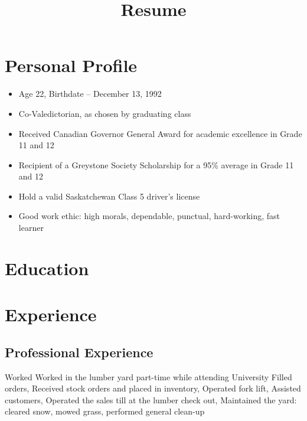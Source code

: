 \documentclass[11pt,letterpaper,sans]{moderncv}        %
\title{Resume}                               %
\begin{document}
\makecvtitle
\vspace*{-1cm} %

\section{Personal Profile}
\cvitem{}
{
  \begin{itemize}
    \item Age 22, Birthdate -- December 13, 1992
    \item Co-Valedictorian, as chosen by graduating class
    \item Received Canadian Governor General Award for academic excellence in Grade 11 and 12
    \item Recipient of a Greystone Society Scholarship for a 95\% average in Grade 11 and 12
    \item Hold a valid Saskatchewan Class 5 driver's license
    \item Good work ethic: high morals, dependable, punctual, hard-working, fast learner
  \end{itemize}
}

\section{Education}


\section{Experience}
\subsection{Professional Experience}
{
  Worked Worked in the lumber yard part-time while attending University
  \newline{}
  Filled orders, Received stock orders and placed in inventory, Operated fork lift, Assisted customers, Operated the sales till at the lumber check out, Maintained the yard: cleared snow, mowed grass, performed general clean-up
}
\end{document}
